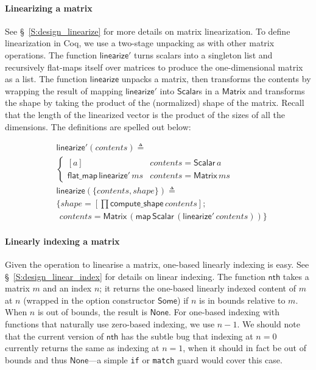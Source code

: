 \documentclass[11pt,conference]{IEEEtran}
\newcommand{\var}[1]{\mathit{#1}}
\newcommand{\func}[1]{\mathsf{#1}}
\theoremstyle{plain} %
\theoremstyle{definition}
\theoremstyle{remark}
\begin{document}
\paragraph{Linearizing a matrix} See \S~\ref{S:design_linearize} for more
details on matrix linearization. To define linearization in Coq, we use a
two-stage unpacking as with other matrix operations. The function
\(\func{linearize'}\) turns scalars into a singleton list and recursively
flat-maps itself over matrices to produce the one-dimensional matrix as a list.
The function \(\func{linearize}\) unpacks a matrix, then transforms the contents
by wrapping the result of mapping \(\func{linearize'}\) into \(\func{Scalar}\)s
in a \(\func{Matrix}\) and transforms the shape by taking the product of the
(normalized) shape of the matrix. Recall that the length of the linearized
vector is the product of the sizes of all the dimensions. The definitions are
spelled out below:

\begin{align*}
    & \func{linearize'}(\var{contents}) \triangleq \\
    & \begin{cases}
        [\var{a}] & \var{contents} = \func{Scalar}\, \var{a} \\
        \func{flat\_map}\, \func{linearize'}\, \var{ms} & \var{contents} =
        \func{Matrix}\, ms
    \end{cases} \\
    & \func{linearize}(\{\var{contents}, \var{shape}\}) \triangleq \\
    & \{ \var{shape} = \left[\prod \func{compute\_shape}\, \var{contents}\right]; \\
    & \ \, \var{contents} = \func{Matrix}\, (\func{map}\, \func{Scalar}\, (\func{linearize'}\, \var{contents})) \}
\end{align*}

\paragraph{Linearly indexing a matrix} Given the operation to linearise a
matrix, one-based linearly indexing is easy. See \S~\ref{S:design_linear_index}
for details on linear indexing. The function \(\func{nth}\) takes a matrix \(m\)
and an index \(n\); it returns the one-based linearly indexed content of \(m\)
at \(n\) (wrapped in the option constructor \(\func{Some}\)) if \(n\) is in
bounds relative to \(m\). When \(n\) is out of bounds, the result is
\(\func{None}\). For one-based indexing with functions that naturally use
zero-based indexing, we use \(n-1\). We should note that the current version of
\(\func{nth}\) has the subtle bug that indexing at \(n=0\) currently returns the
same as indexing at \(n=1\), when it should in fact be out of bounds and thus
\(\func{None}\)---a simple \texttt{if} or \texttt{match} guard would cover this
case.
\end{document}
